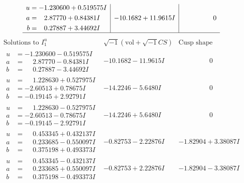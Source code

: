 \documentclass[1p]{elsarticle_modified}
\theoremstyle{definition}
\newcommand{\I}{\sqrt{-1}}
\begin{document}
$$\begin{array}{c|c|c}
\begin{aligned}
u &= -1.230600 + 0.519575 I \\
a &= \phantom{-}2.87770 + 0.84381 I \\
b &= \phantom{-}0.27887 + 3.44692 I\end{aligned}
 & -10.1682 + 11.9615 I & \phantom{-0.000000 } 0\\
 \hline 
 \end{array}$$\newpage$$\begin{array}{c|c|c}  
\text{Solutions to }I^u_{1}& \I (\text{vol} + \sqrt{-1}CS) & \text{Cusp shape}\\
 \hline 
\begin{aligned}
u &= -1.230600 - 0.519575 I \\
a &= \phantom{-}2.87770 - 0.84381 I \\
b &= \phantom{-}0.27887 - 3.44692 I\end{aligned}
 & -10.1682 - 11.9615 I & \phantom{-0.000000 } 0 \\ \hline\begin{aligned}
u &= \phantom{-}1.228630 + 0.527975 I \\
a &= -2.60513 + 0.78675 I \\
b &= -0.19145 + 2.92791 I\end{aligned}
 & -14.2246 - 5.6480 I & \phantom{-0.000000 } 0 \\ \hline\begin{aligned}
u &= \phantom{-}1.228630 - 0.527975 I \\
a &= -2.60513 - 0.78675 I \\
b &= -0.19145 - 2.92791 I\end{aligned}
 & -14.2246 + 5.6480 I & \phantom{-0.000000 } 0 \\ \hline\begin{aligned}
u &= \phantom{-}0.453345 + 0.432137 I \\
a &= \phantom{-}0.233685 - 0.550097 I \\
b &= \phantom{-}0.375198 + 0.493373 I\end{aligned}
 & -0.82753 - 2.22876 I & -1.82904 + 3.38087 I \\ \hline\begin{aligned}
u &= \phantom{-}0.453345 - 0.432137 I \\
a &= \phantom{-}0.233685 + 0.550097 I \\
b &= \phantom{-}0.375198 - 0.493373 I\end{aligned}
 & -0.82753 + 2.22876 I & -1.82904 - 3.38087 I \\ \hline\begin{aligned}

\end{aligned}
\end{array}$$
\end{document}
